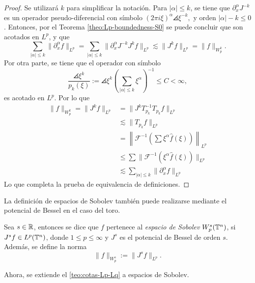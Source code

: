 \begin{proof}
	Se utilizará $k$ para simplificar la notación. Para $|\alpha|\leq k$, se tiene que $\partial^\alpha_xJ^{-k}$ es un operador pseudo-diferencial con símbolo $(2\pi i\xi)^\alpha\angles{\xi}^{-k},$ y orden $|\alpha|-k\leq0$. Entonces, por el Teorema \ref{theo:Lp-boundedness-S0} se puede concluir que son acotados en $L^p$, y que
	\begin{equation*}
		\sum_{|\alpha|\leq k} \|\partial^\alpha_xf\|_{L^p} = \sum_{|\alpha|\leq k} \|\partial^\alpha_xJ^{-k}J^kf\|_{L^p} \lesssim \|J^kf\|_{L^p} = \|f\|_{W^k_p}.
	\end{equation*}
	Por otra parte, se tiene que el operador con símbolo
	\begin{equation*}
		\frac{\angles{\xi}^k}{p_k(\xi)}:= \angles{\xi}^k \left(\sum_{|\alpha|\leq k} \xi^\alpha
		\right)^{-1} \leq C <\infty,
	\end{equation*}
	es acotado en $L^p$. Por lo que  
	\begin{align*}
		\|f\|_{W^k_p} =\|J^kf\|_{L^p} & = \|J^kT_{p_k}^{-1}T_{p_k} f\|_{L^p} \\
		& \lesssim \|T_{p_k} f\|_{L^p} \\ 
		& = \left\|\mathcal{F}^{-1}\left(\sum\xi^\alpha \widehat{f}(\xi)\right)\right\|_{L^p}  \\
		& \leq \sum \|\mathcal{F}^{-1}(\xi^\alpha\widehat{f}(\xi))\|_{L^p} \\
		& \lesssim \sum_{|\alpha|\leq k} \|\partial^\alpha_xf\|_{L^p}
	\end{align*}
	Lo que completa la prueba de equivalencia de definiciones.
\end{proof}
La definición de espacios de Sobolev también puede realizarse mediante el potencial de Bessel en el caso del toro.
\begin{definition}
Sea $s\in\mathbb{R}$, entonces se dice que $f$ pertenece al \textit{espacio de Sobolev} $W^s_p(\mathbb{T}^n)$, si $J^sf\in L^p(\mathbb{T}^n)$, donde $1\leq p\leq\infty$ y $J^s$ es el potencial de Bessel de orden $s$. Además, se define la norma
\begin{equation*}
	\|f\|_{W^s_p} := \|J^sf\|_{L^p}.
\end{equation*} 
\end{definition}
Ahora, se extiende el \cref{teo:cotas-Lp-Lq} a espacios de Sobolev.
